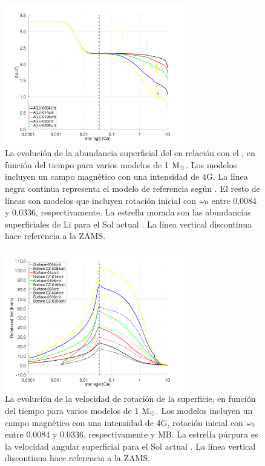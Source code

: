 \begin{figure}
    \centering
	\includegraphics[width=0.7\textwidth]{img/paper2/li_var_vel_4_0g4.pdf}
	\caption{La evolución de la abundancia superficial del  en relación con el , en función del tiempo para varios modelos de 1 $\mathrm{M}_\odot$. Los modelos incluyen un campo magnético con una intensidad de 4G. La línea negra continua representa el modelo de referencia según \cite{Choi2016}. El resto de líneas son modelos que incluyen rotación inicial con $\omega_{\mathrm{0}}$ entre 0.0084 y 0.0336, respectivamente. La estrella morada son las abundancias superficiales de Li para el Sol actual \cite{Asplund2009}. La línea vertical discontinua hace referencia a la ZAMS.}
	\label{fig:li_var_vel_4_0g4}
\end{figure}

\begin{figure}
    \centering
	\includegraphics[width=0.7\textwidth]{img/paper2/rot_vel_var_vel_4_0g4.pdf}
	\caption{La evolución de la velocidad de rotación de la superficie, en función del tiempo para varios modelos de 1 $\mathrm{M}_\odot$. Los modelos incluyen un campo magnético con una intensidad de 4G, rotación inicial con $\omega_{\mathrm{0}}$ entre 0.0084 y 0.0336, respectivamente y MB. La estrella púrpura es la velocidad angular superficial para el Sol actual \cite{Gill2012}. La línea vertical discontinua hace referencia a la ZAMS.}
	\label{fig:rot_vel_var_vel_4_0g4}
\end{figure}

